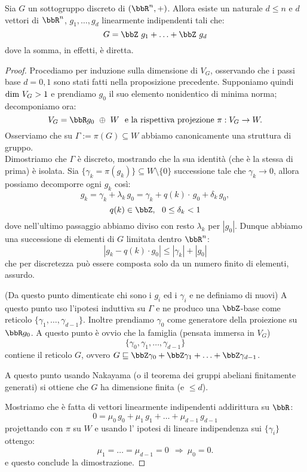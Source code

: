 \begin{teorema}Sia $G$ un sottogruppo discreto di $(\bbR^n,+)$. Allora esiste un naturale $d\leq n$ e $d$ vettori di $\bbR^n$, $g_1,\ldots,g_d$ linearmente indipendenti tali che:
$$
G=\bbZ\ g_1+\ldots+\bbZ\ g_d
$$
dove la somma, in effetti, è diretta.
\end{teorema}
\begin{proof}
Procediamo per induzione sulla dimensione di $V_G$, osservando che i passi base $d=0,1$ sono stati fatti nella proposizione precedente. Supponiamo quindi $\mbox{dim }{V_G}>1$ e prendiamo $g_0$ il suo elemento nonidentico di minima norma; decomponiamo ora:
$$
V_G=\bbR g_0\ \oplus\  W\ \mbox{ e la rispettiva projezione}\ \pi:V_G\rightarrow W.
$$
Osserviamo che su $\Gamma:=\pi(G)\subseteq W$ abbiamo canonicamente una struttura di gruppo.\\
Dimostriamo che $\Gamma$ è discreto, mostrando che la sua identità (che è la stessa di prima) è isolata. Sia $\{\gamma_k=\pi(g_k)\}\subseteq W\setminus\{0\}$ successione tale che $\gamma_k\rightarrow 0$, allora possiamo decomporre ogni $g_k$ così:
$$
g_k=\gamma_k+\lambda_k\, g_0=\gamma_k+q(k)\cdot\, g_0+\delta_k\, g_0,
$$
$$
q(k)\in\bbZ,\ \ 0\leq \delta_k<1
$$
dove nell'ultimo passaggio abbiamo diviso con resto $\lambda_k$ per $|g_0|$. Dunque abbiamo una successione di elementi di $G$ limitata dentro $\bbR^n$:
$$
|g_k-q(k)\cdot g_0| \leq |\gamma_k|+|g_0|
$$
che per discretezza può essere composta solo da un numero finito di elementi, assurdo.

(Da questo punto dimenticate chi sono i $g_i$ ed i $\gamma_i$ e ne definiamo di nuovi)
A questo punto uso l'ipotesi induttiva su $\Gamma$ e ne produco una $\bbZ$-base come reticolo $\{\gamma_1, \ldots, \gamma_{d-1}\}$.
Inoltre prendiamo $\gamma_0$ come generatore della proiezione su $\bbR g_0$.
A questo punto è ovvio che la famiglia (pensata immersa in $V_G$)
$$
\{\gamma_0,\gamma_1,\ldots,\gamma_{d-1}\}
$$ 
contiene il reticolo $G$, ovvero $G \sqsubseteq \bbZ \gamma_0 + \bbZ \gamma_1 + \ldots + \bbZ \gamma_{d-1}$.

A questo punto usando Nakayama (o il teorema dei gruppi abeliani finitamente generati) si ottiene che $G$ ha dimensione finita (e $\le d$).

Mostriamo che è fatta di vettori linearmente indipendenti addirittura su $\bbR$:
$$
0=\mu_0\, g_0+\mu_1\, g_1+\ldots+\mu_{d-1}\, g_{d-1}
$$
projettando con $\pi$ su $W$ e usando l' ipotesi di lineare indipendenza sui $\{\gamma_i\}$ ottengo:
$$
\mu_1=\ldots=\mu_{d-1}=0\ \ \Rightarrow\  \mu_0=0.
$$
e questo conclude la dimostrazione.
\end{proof}

